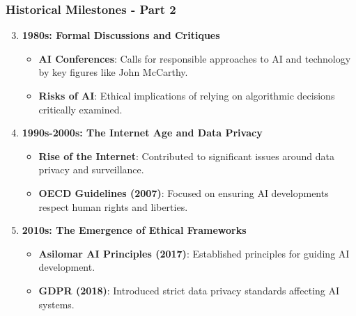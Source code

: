 \documentclass{beamer}
\begin{document}
\begin{frame}[fragile]
    \frametitle{Historical Milestones - Part 2}
    \begin{enumerate}
        \setcounter{enumi}{2} %
        \item \textbf{1980s: Formal Discussions and Critiques}
        \begin{itemize}
            \item \textbf{AI Conferences}: Calls for responsible approaches to AI and technology by key figures like John McCarthy.
            \item \textbf{Risks of AI}: Ethical implications of relying on algorithmic decisions critically examined.
        \end{itemize}
        
        \item \textbf{1990s-2000s: The Internet Age and Data Privacy}
        \begin{itemize}
            \item \textbf{Rise of the Internet}: Contributed to significant issues around data privacy and surveillance.
            \item \textbf{OECD Guidelines (2007)}: Focused on ensuring AI developments respect human rights and liberties.
        \end{itemize}
        
        \item \textbf{2010s: The Emergence of Ethical Frameworks}
        \begin{itemize}
            \item \textbf{Asilomar AI Principles (2017)}: Established principles for guiding AI development.
            \item \textbf{GDPR (2018)}: Introduced strict data privacy standards affecting AI systems.
        \end{itemize}
    \end{enumerate}
\end{frame}
\end{document}
